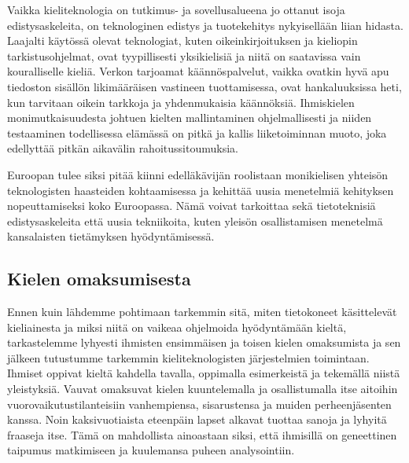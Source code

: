 \begin{multicols}{2}
Vaikka kieliteknologia on tutkimus- ja sovellusalueena jo ottanut isoja edistysaskeleita, on teknologinen edistys ja tuotekehitys nykyisellään liian hidasta. Laajalti käytössä olevat teknologiat, kuten oikeinkirjoituksen ja kieliopin tarkistusohjelmat, ovat tyypillisesti yksikielisiä ja niitä on saatavissa vain kouralliselle kieliä. Verkon tarjoamat käännöspalvelut, vaikka ovatkin hyvä apu tiedoston sisällön likimääräisen vastineen tuottamisessa, ovat hankaluuksissa heti, kun tarvitaan oikein tarkkoja ja yhdenmukaisia käännöksiä. Ihmiskielen monimutkaisuudesta johtuen kielten mallintaminen ohjelmallisesti ja niiden testaaminen todellisessa elämässä on pitkä ja kallis liiketoiminnan muoto, joka edellyttää pitkän aikavälin rahoitussitoumuksia.  


Euroopan tulee siksi pitää kiinni edelläkävijän roolistaan monikielisen yhteisön teknologisten haasteiden kohtaamisessa ja kehittää uusia menetelmiä kehityksen nopeuttamiseksi koko Euroopassa. Nämä voivat tarkoittaa sekä tietoteknisiä edistysaskeleita että uusia tekniikoita, kuten yleisön osallistamisen menetelmä kansalaisten tietämyksen hyödyntämisessä.

\subsection{Kielen omaksumisesta}

Ennen kuin lähdemme pohtimaan tarkemmin sitä, miten tietokoneet käsittelevät kieliainesta ja miksi niitä on vaikeaa ohjelmoida hyödyntämään kieltä, tarkastelemme lyhyesti ihmisten ensimmäisen ja toisen kielen omaksumista ja sen jälkeen tutustumme tarkemmin kieliteknologisten järjestelmien toimintaan.  Ihmiset oppivat kieltä kahdella tavalla, oppimalla esimerkeistä ja tekemällä niistä yleistyksiä.  Vauvat omaksuvat kielen kuuntelemalla ja osallistumalla itse aitoihin vuorovaikutustilanteisiin vanhempiensa, sisarustensa ja muiden perheenjäsenten kanssa. Noin kaksivuotiaista eteenpäin lapset alkavat tuottaa sanoja ja lyhyitä fraaseja itse. Tämä on mahdollista ainoastaan siksi, että ihmisillä on geneettinen taipumus matkimiseen ja kuulemansa puheen analysointiin.



\end{multicols}
